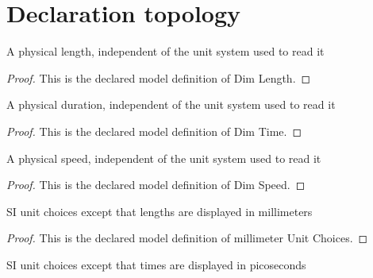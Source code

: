\section{Declaration topology}
\begin{definition}
  \label{def:physics:phyx-mini-0085:phyxminiproblems-problemphyxmini0085-dimlength}
  A physical length, independent of the unit system used to read it
\end{definition}
\begin{proof}
  This is the declared model definition of Dim Length.
\end{proof}
\begin{definition}
  \label{def:physics:phyx-mini-0085:phyxminiproblems-problemphyxmini0085-dimtime}
  A physical duration, independent of the unit system used to read it
\end{definition}
\begin{proof}
  This is the declared model definition of Dim Time.
\end{proof}
\begin{definition}
  \label{def:physics:phyx-mini-0085:phyxminiproblems-problemphyxmini0085-dimspeed}
  A physical speed, independent of the unit system used to read it
\end{definition}
\begin{proof}
  This is the declared model definition of Dim Speed.
\end{proof}
\begin{definition}
  \label{def:physics:phyx-mini-0085:phyxminiproblems-problemphyxmini0085-millimeterunitchoices}
  SI unit choices except that lengths are displayed in millimeters
\end{definition}
\begin{proof}
  This is the declared model definition of millimeter Unit Choices.
\end{proof}
\begin{definition}
  \label{def:physics:phyx-mini-0085:phyxminiproblems-problemphyxmini0085-picosecondunitchoices}
  SI unit choices except that times are displayed in picoseconds
\end{definition}
